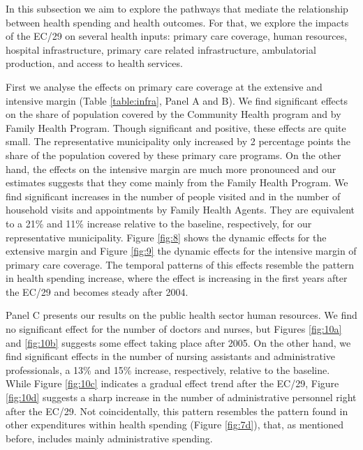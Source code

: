 In this subsection we aim to explore the pathways that mediate the relationship between health spending and health outcomes. For that, we explore the impacts of the EC/29 on several health inputs: primary care coverage, human resources, hospital infrastructure, primary care related infrastructure, ambulatorial production, and access to health services. 



First we analyse the effects on primary care coverage at the extensive and intensive margin (Table \ref{table:infra}, Panel A and B). We find significant effects on the share of population covered by the Community Health program and by Family Health Program. Though significant and positive, these effects are quite small. The representative municipality only increased by 2 percentage points the share of the population covered by these primary care programs. On the other hand, the effects on the intensive margin are much more pronounced and our estimates suggests that they come mainly from the Family Health Program. We find significant increases in the number of people visited and in the number of household visits and appointments by Family Health Agents. They are equivalent to a 21\% and 11\% increase relative to the baseline, respectively, for our representative municipality. Figure \ref{fig:8} shows the dynamic effects for the extensive margin and Figure \ref{fig:9} the dynamic effects for the intensive margin of primary care coverage. The temporal patterns of this effects resemble the pattern in health spending increase, where the effect is increasing in the first years after the EC/29 and becomes steady after 2004. 





Panel C presents our results on the public health sector human resources. We find no significant effect for the number of doctors and nurses, but Figures \ref{fig:10a} and \ref{fig:10b} suggests some effect taking place after 2005. On the other hand, we find significant effects in the number of nursing assistants and administrative professionals, a 13\% and 15\% increase, respectively, relative to the baseline. While Figure \ref{fig:10c} indicates a gradual effect trend after the EC/29, Figure \ref{fig:10d} suggests a sharp increase in the number of administrative personnel right after the EC/29. Not coincidentally, this pattern resembles the pattern found in other expenditures within health spending (Figure \ref{fig:7d}), that, as mentioned before, includes mainly administrative spending. 


